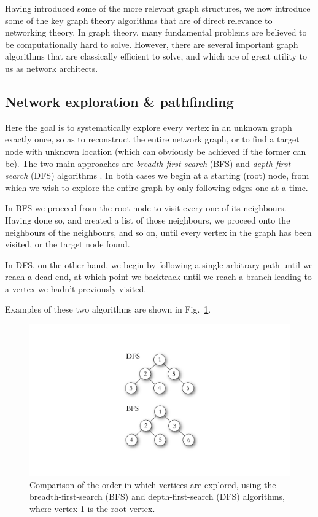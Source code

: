 \documentclass[aps,rmp,twocolumn,amsmath,amssymb,nofootinbib,superscriptaddress]{revtex4}
\begin{document}
Having introduced some of the more relevant graph structures, we now introduce some of the key graph theory algorithms that are of direct relevance to networking theory. In graph theory, many fundamental problems are believed to be computationally hard to solve. However, there are several important graph algorithms that are classically efficient to solve, and which are of great utility to us as network architects.

%
%

\subsection{Network exploration \& pathfinding} \label{sec:path_exp}

Here the goal is to systematically explore every vertex in an unknown graph exactly once, so as to reconstruct the entire network graph, or to find a target node with unknown location (which can obviously be achieved if the former can be). The two main approaches are \emph{breadth-first-search} (BFS) and \emph{depth-first-search} (DFS) algorithms \cite{???}. In both cases we begin at a starting (root) node, from which we wish to explore the entire graph by only following edges one at a time.

In BFS we proceed from the root node to visit every one of its neighbours. Having done so, and created a list of those neighbours, we proceed onto the neighbours of the neighbours, and so on, until every vertex in the graph has been visited, or the target node found.

In DFS, on the other hand, we begin by following a single arbitrary path until we reach a dead-end, at which point we backtrack until we reach a branch leading to a vertex we hadn't previously visited.

Examples of these two algorithms are shown in Fig.~\ref{fig:BFS_DFS}.

\begin{figure}[!htb]
\includegraphics[width=0.6\columnwidth]{BFS_DFS}
\caption{Comparison of the order in which vertices are explored, using the breadth-first-search (BFS) and depth-first-search (DFS) algorithms, where vertex 1 is the root vertex.} \label{fig:BFS_DFS}
\end{figure}
\end{document}
